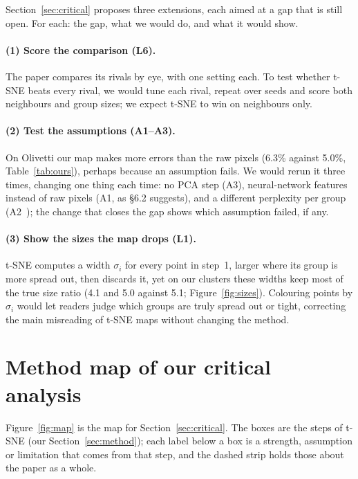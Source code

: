\documentclass{article}
\newcommand{\appendixnumbering}[1]{%
  \setcounter{figure}{0}\setcounter{table}{0}%
  \renewcommand{\thefigure}{#1\arabic{figure}}\renewcommand{\theHfigure}{#1\arabic{figure}}%
  \renewcommand{\thetable}{#1\arabic{table}}\renewcommand{\theHtable}{#1\arabic{table}}}
\begin{document}
Section~\ref{sec:critical} proposes three extensions, each aimed at a gap that is still open. For each: the gap, what we would do, and what it would show.

\paragraph{(1) Score the comparison (L6).} The paper compares its rivals by eye, with one setting each. To test whether t-SNE beats every rival, we would tune each rival, repeat over seeds and score both neighbours and group sizes; we expect t-SNE to win on neighbours only.

\paragraph{(2) Test the assumptions (A1--A3).} On Olivetti our map makes more errors than the raw pixels (6.3\% against 5.0\%, Table~\ref{tab:ours}), perhaps because an assumption fails. We would rerun it three times, changing one thing each time: no PCA step (A3), neural-network features instead of raw pixels (A1, as \S6.2 suggests), and a different perplexity per group (A2~\cite{lee15}); the change that closes the gap shows which assumption failed, if any.

\paragraph{(3) Show the sizes the map drops (L1).} t-SNE computes a width $\sigma_i$ for every point in step~1, larger where its group is more spread out, then discards it, yet on our clusters these widths keep most of the true size ratio (4.1 and 5.0 against 5.1; Figure~\ref{fig:sizes}). Colouring points by $\sigma_i$ would let readers judge which groups are truly spread out or tight, correcting the main misreading of t-SNE maps without changing the method.

\section{Method map of our critical analysis}
\label{app:map}
\appendixnumbering{E}

Figure~\ref{fig:map} is the map for Section~\ref{sec:critical}. The boxes are the steps of t-SNE (our Section~\ref{sec:method}); each label below a box is a strength, assumption or limitation that comes from that step, and the dashed strip holds those about the paper as a whole.
\end{document}

